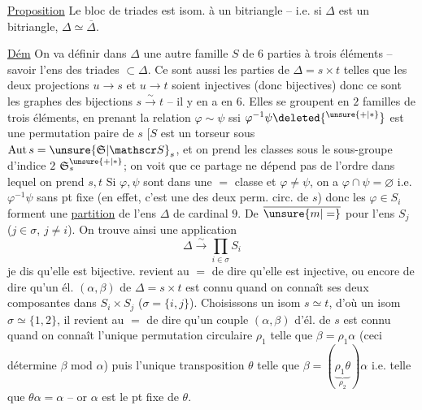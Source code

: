\uline{Proposition} Le bloc de triades est isom. à un bitriangle -- i.e. si $\Delta$  est un bitriangle, $\Delta\simeq\overline\Delta$.

\uline{Dém} On va définir dans $\Delta$ une autre famille $S$ de $6$ parties à trois éléments -- savoir l'ens  des triades $\subset\Delta$. Ce sont aussi les parties  de $\Delta=s\times t$  telles que les deux projections $u\to s$ et $u\to t$ soient injectives (donc bijectives) donc ce sont les graphes des bijections $s\xrightarrow{\sim}t$ -- il y en a en $6$.
Elles se groupent en $2$ familles de trois éléments, en prenant  la relation $\varphi\sim\psi$ ssi $\varphi^{-1}\psi\deleted{^{\unsure{+|\ast}}}$ est une permutation paire de $s$  [$S$  est un torseur sous  $\mathrm{Aut}\,s=\unsure{\mathfrak S|\mathscr S}_s$, et on prend les  classes sous le sous-groupe d'indice $2$ $\mathfrak S_s^{\unsure{+|\ast}}$; on voit que ce partage ne dépend pas de l'ordre dans lequel on prend $s,t$ 
Si $\varphi,\psi$  sont dans une $=$ classe  et $\varphi\ne\psi$, on a $\varphi\cap\psi=\varnothing$ i.e. $\varphi^{-1}\psi$ sans pt fixe (en effet, c'est une des deux perm. circ. de $s$) donc les  $\varphi\in S_i$ forment une \uline{partition} de l'ens $\Delta$ de cardinal $9$. De $\overline{\unsure{m|=}}$ pour l'ens $S_j$ ($j\in\sigma$, $j\ne i$). On trouve ainsi une application
\[
\Delta\xrightarrow{\sim}\prod_{i\in\sigma}S_i
\]
je dis qu'elle est bijective.  revient au $=$ de dire qu'elle est injective, ou encore de dire qu'un él. $(\alpha,\beta)$ de $\Delta=s\times t$ est connu quand on connaît ses deux composantes dans $S_i\times S_j$ ($\sigma=\{i,j\}$). Choisissons un isom $s\simeq t$, d'où un isom $\sigma\simeq\{1,2\}$,   il revient au $=$ de dire qu'un couple $(\alpha,\beta)$ d'él. de $s$ est connu quand on connaît l'unique permutation circulaire $\rho_1$ telle que $\beta=\rho_1\alpha$ (ceci détermine $\beta$ mod $\alpha$) puis l'unique transposition $\theta$ telle que $\beta=(\underbrace{\rho_1\theta}_{\rho_2})\alpha$ i.e. telle que $\theta\alpha=\alpha$ -- or $\alpha$ est  le  pt fixe de $\theta$.

